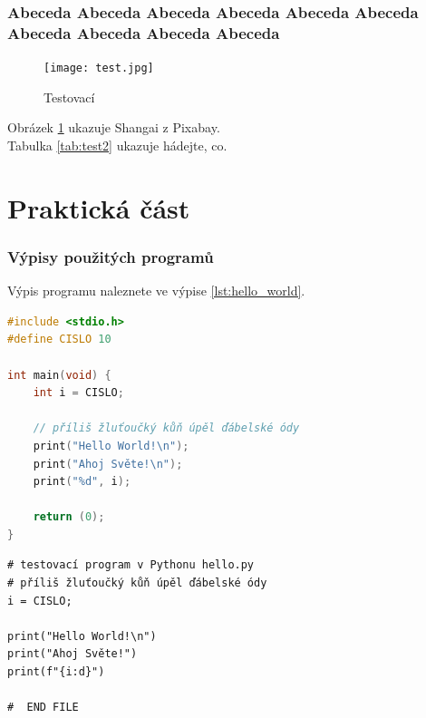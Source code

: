 \documentclass[12pt]{report}			%
\begin{document}
				\lipsum[2]

			\section[X-krát Abeceda]{Abeceda Abeceda Abeceda Abeceda Abeceda Abeceda Abeceda Abeceda Abeceda Abeceda }
				\begin{figure}
				  \texttt{[image: test.jpg]}
				  \caption{Testovací}
				  \label{fig:test}
				\end{figure}
				Obrázek \ref{fig:test} ukazuje Shangai z Pixabay.\\
				Tabulka \ref{tab:test2} ukazuje hádejte, co.
		
	\lipsum[3]

	\part{Praktická část}

\section{Výpisy použitých programů}

\lipsum[1]	

Výpis programu   naleznete ve výpise \ref{lst:hello_world}.

\begin{lstlisting}[language=C++,
	title={Program hello.c}, 
	caption={hello.c}, 
  	otherkeywords={define,\#,include },
	label={lst:hello_world}]
#include <stdio.h>
#define CISLO 10

int main(void) {
	int i = CISLO;

	// příliš žluťoučký kůň úpěl ďábelské ódy
	print("Hello World!\n");
	print("Ahoj Světe!\n");
	print("%d", i);

	return (0);
}
\end{lstlisting}

\lipsum[1]	

\begin{lstlisting}[firstnumber=10, title={Program hello.py}, caption={hello.py}, label={lst:hello_world_py}]
# testovací program v Pythonu hello.py
# příliš žluťoučký kůň úpěl ďábelské ódy
i = CISLO;

print("Hello World!\n")
print("Ahoj Světe!")
print(f"{i:d}")

#  END FILE
\end{lstlisting}
\end{document}
